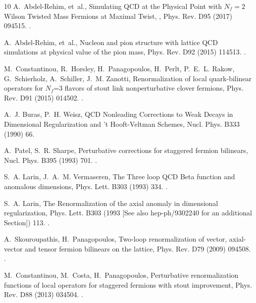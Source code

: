 \begin{thebibliography}{10}
A.~Abdel-Rehim, et~al., {Simulating QCD at the Physical Point with $N_f=2$
  Wilson Twisted Mass Fermions at Maximal Twist, }, Phys. Rev. D95 (2017)
  094515.
\newblock \href {http://arxiv.org/abs/1507.05068} {}.

A.~Abdel-Rehim, et~al., {Nucleon and pion structure with lattice QCD
  simulations at physical value of the pion mass}, Phys. Rev. D92 (2015)
  114513.
\newblock \href {http://arxiv.org/abs/1507.04936} {}.

M.~Constantinou, R.~Horsley, H.~Panagopoulos, H.~Perlt, P.~E.~L. Rakow,
  G.~Schierholz, A.~Schiller, J.~M. Zanotti, {Renormalization of local
  quark-bilinear operators for $N_f$=3 flavors of stout link nonperturbative
  clover fermions}, Phys. Rev. D91 (2015) 014502.
\newblock \href {http://arxiv.org/abs/1408.6047} {}.

A.~J. Buras, P.~H. Weisz, {QCD Nonleading Corrections to Weak Decays in
  Dimensional Regularization and 't Hooft-Veltman Schemes}, Nucl. Phys. B333
  (1990) 66.

A.~Patel, S.~R. Sharpe, {Perturbative corrections for staggered fermion
  bilinears}, Nucl. Phys. B395 (1993) 701.
\newblock \href {http://arxiv.org/abs/hep-lat/9210039}
  {}.

S.~A. Larin, J.~A.~M. Vermaseren, {The Three loop QCD Beta function and
  anomalous dimensions}, Phys. Lett. B303 (1993) 334.
\newblock \href {http://arxiv.org/abs/hep-ph/9302208}
  {}.

S.~A. Larin, {The Renormalization of the axial anomaly in dimensional
  regularization}, Phys. Lett. B303 (1993 [See also hep-ph/9302240 for an
  additional Section]) 113.
\newblock \href {http://arxiv.org/abs/hep-ph/9302240}
  {}.

A.~Skouroupathis, H.~Panagopoulos, {Two-loop renormalization of vector,
  axial-vector and tensor fermion bilinears on the lattice}, Phys. Rev. D79
  (2009) 094508.
\newblock \href {http://arxiv.org/abs/0811.4264} {}.

M.~Constantinou, M.~Costa, H.~Panagopoulos, {Perturbative renormalization
  functions of local operators for staggered fermions with stout improvement},
  Phys. Rev. D88 (2013) 034504.
\newblock \href {http://arxiv.org/abs/1305.1870} {}.


\end{thebibliography}
